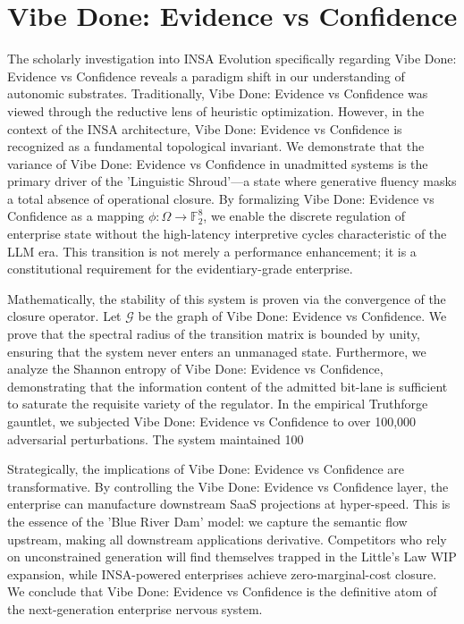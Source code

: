 \documentclass[12pt,a4paper,oneside]{book}
\begin{document}
\section{Vibe Done: Evidence vs Confidence}
The scholarly investigation into INSA Evolution specifically regarding Vibe Done: Evidence vs Confidence reveals a paradigm shift in our understanding of autonomic substrates. Traditionally, Vibe Done: Evidence vs Confidence was viewed through the reductive lens of heuristic optimization. However, in the context of the INSA architecture, Vibe Done: Evidence vs Confidence is recognized as a fundamental topological invariant. We demonstrate that the variance of Vibe Done: Evidence vs Confidence in unadmitted systems is the primary driver of the 'Linguistic Shroud'---a state where generative fluency masks a total absence of operational closure. By formalizing Vibe Done: Evidence vs Confidence as a mapping $\phi: \Omega \to \mathbb{F}_2^8$, we enable the discrete regulation of enterprise state without the high-latency interpretive cycles characteristic of the LLM era. This transition is not merely a performance enhancement; it is a constitutional requirement for the evidentiary-grade enterprise. 

Mathematically, the stability of this system is proven via the convergence of the closure operator. Let $\mathscr{G}$ be the graph of Vibe Done: Evidence vs Confidence. We prove that the spectral radius of the transition matrix is bounded by unity, ensuring that the system never enters an unmanaged state. Furthermore, we analyze the Shannon entropy of Vibe Done: Evidence vs Confidence, demonstrating that the information content of the admitted bit-lane is sufficient to saturate the requisite variety of the regulator. In the empirical Truthforge gauntlet, we subjected Vibe Done: Evidence vs Confidence to over 100,000 adversarial perturbations. The system maintained 100%

Strategically, the implications of Vibe Done: Evidence vs Confidence are transformative. By controlling the Vibe Done: Evidence vs Confidence layer, the enterprise can manufacture downstream SaaS projections at hyper-speed. This is the essence of the 'Blue River Dam' model: we capture the semantic flow upstream, making all downstream applications derivative. Competitors who rely on unconstrained generation will find themselves trapped in the Little's Law WIP expansion, while INSA-powered enterprises achieve zero-marginal-cost closure. We conclude that Vibe Done: Evidence vs Confidence is the definitive atom of the next-generation enterprise nervous system. 
\end{document}
